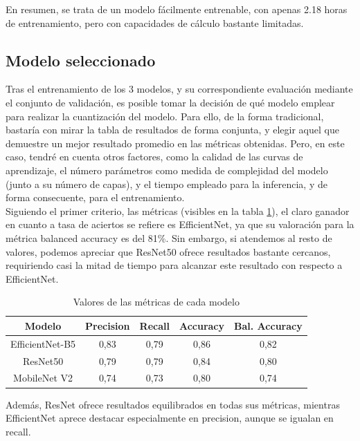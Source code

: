 En resumen, se trata de un modelo fácilmente entrenable, con apenas 2.18 horas de entrenamiento, pero con capacidades de cálculo bastante limitadas.

\subsection{Modelo seleccionado}

Tras el entrenamiento de los 3 modelos, y su correspondiente evaluación mediante el conjunto de validación, es posible tomar la decisión de qué modelo emplear para realizar la cuantización del modelo. Para ello, de la forma tradicional, bastaría con mirar la tabla de resultados de forma conjunta, y elegir aquel que demuestre un mejor resultado promedio en las métricas obtenidas. Pero, en este caso, tendré en cuenta otros factores, como la calidad de las curvas de aprendizaje, el número parámetros como medida de complejidad del modelo (junto a su número de capas), y el tiempo empleado para la inferencia, y de forma consecuente, para el entrenamiento.\\

Siguiendo el primer criterio, las métricas (visibles en la tabla \ref{fig:metricas}), el claro ganador en cuanto a tasa de aciertos se refiere es EfficientNet, ya que su valoración para la métrica balanced accuracy es del 81\%. Sin embargo, si atendemos al resto de valores, podemos apreciar que ResNet50 ofrece resultados bastante cercanos,  requiriendo casi la mitad de tiempo para alcanzar este resultado con respecto a EfficientNet.


\begin{table}[H]
	\centering
	\begin{tabular}{|c|c|c|c|c|}
		\hline
		\textbf{Modelo} & \textbf{Precision} & \textbf{Recall} & \textbf{Accuracy} & \textbf{Bal. Accuracy} \\ \hline
		EfficientNet-B5 & 0,83 & 0,79 & 0,86 & 0,82 \\ \hline
		ResNet50 & 0,79 & 0,79 & 0,84 & 0,80 \\ \hline
		MobileNet V2 & 0,74 & 0,73 & 0,80 & 0,74 \\ \hline
	\end{tabular}
	\caption{Valores de las métricas de cada modelo}
	\label {fig:metricas}
\end{table}

Además, ResNet ofrece resultados equilibrados en todas sus métricas, mientras EfficientNet aprece destacar especialmente en precision, aunque se igualan en recall.\\

